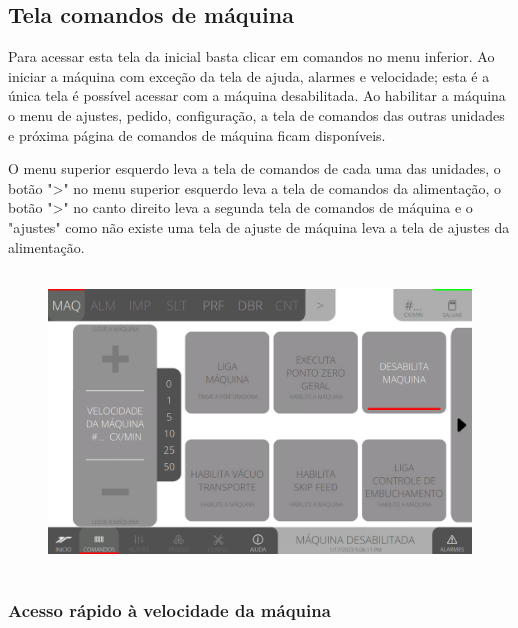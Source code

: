 \thispagestyle{fancy}

\vspace*{40 pt}

\subsection{Tela comandos de máquina}

Para acessar esta tela da inicial basta clicar em comandos no menu inferior. Ao iniciar a máquina com exceção da tela de ajuda, alarmes e velocidade; esta é a única tela é possível acessar com a máquina desabilitada. Ao habilitar a máquina o menu de ajustes, pedido, configuração, a tela de comandos das outras unidades e próxima página de comandos de máquina ficam disponíveis.

O menu superior esquerdo leva a tela de comandos de cada uma das unidades, o botão "\textgreater" no menu superior esquerdo leva a tela de comandos da alimentação, o botão "\textgreater" no canto direito leva a segunda tela de comandos de máquina e o "ajustes" como não existe uma tela de ajuste de máquina leva a tela de ajustes da alimentação.

\vspace*{\fill}

\begin{figure}[h]
  \centering
  \includegraphics[width=480px,height=300px]{src/imagesFlexo/02-machine/e-Tela-Principal.png}
\end{figure}

\vspace*{\fill}

\newpage
\thispagestyle{fancy}

\vspace*{40 pt}

\subsubsection{\small{Acesso rápido à velocidade da máquina}}

